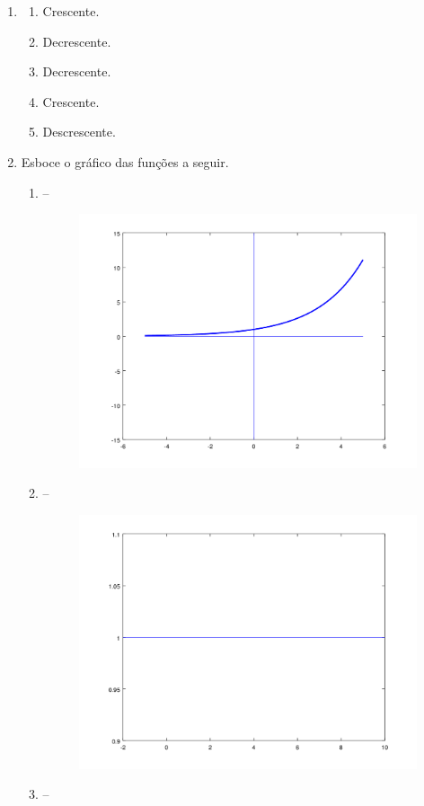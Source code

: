 \documentclass[11pt]{article}
\begin{document}
\begin{enumerate}
	\item
	\begin{enumerate}
		\item Crescente.
		\item Decrescente.
		\item Decrescente.
		\item Crescente.
		\item Descrescente.
	\end{enumerate}

	\item Esboce o gráfico das funções a seguir.
	\begin{enumerate}
		\item --
			\begin{figure}[H]
				\centering
				\includegraphics[width=0.7\linewidth]{imgs/ex2a.png}
			\end{figure}
		\item --
			\begin{figure}[H]
				\centering
				\includegraphics[width=0.7\linewidth]{imgs/ex2b.png}
			\end{figure}
		\item --
			\begin{figure}[H]

\end{figure}
\end{enumerate}
\end{enumerate}
\end{document}
